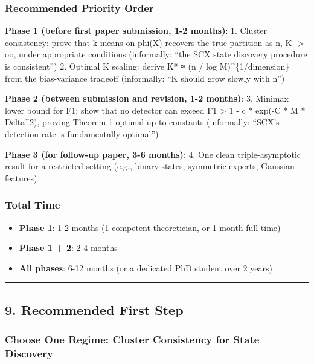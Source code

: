 \documentclass[
  12pt,
]{article}
\providecommand{\tightlist}{%
  \setlength{\itemsep}{0pt}\setlength{\parskip}{0pt}}
\begin{document}
\subsubsection{Recommended Priority
Order}\label{recommended-priority-order}

\textbf{Phase 1 (before first paper submission, 1-2 months)}: 1. Cluster
consistency: prove that k-means on phi(X) recovers the true partition as
n, K -\textgreater{} oo, under appropriate conditions (informally: ``the
SCX state discovery procedure is consistent'') 2. Optimal K scaling:
derive K* ≈ (n / log M)\^{}\{1/dimension\} from the bias-variance
tradeoff (informally: ``K should grow slowly with n'')

\textbf{Phase 2 (between submission and revision, 1-2 months)}: 3.
Minimax lower bound for F1: show that no detector can exceed F1
\textgreater{} 1 - c * exp(-C * M * Delta\^{}2), proving Theorem 1
optimal up to constants (informally: ``SCX's detection rate is
fundamentally optimal'')

\textbf{Phase 3 (for follow-up paper, 3-6 months)}: 4. One clean
triple-asymptotic result for a restricted setting (e.g., binary states,
symmetric experts, Gaussian features)

\subsubsection{Total Time}\label{total-time}

\begin{itemize}
\tightlist
\item
  \textbf{Phase 1}: 1-2 months (1 competent theoretician, or 1 month
  full-time)
\item
  \textbf{Phase 1 + 2}: 2-4 months
\item
  \textbf{All phases}: 6-12 months (or a dedicated PhD student over 2
  years)
\end{itemize}

\begin{center}\rule{0.5\linewidth}{0.5pt}\end{center}

\subsection{9. Recommended First Step}\label{recommended-first-step}

\subsubsection{Choose One Regime: Cluster Consistency for State
Discovery}\label{choose-one-regime-cluster-consistency-for-state-discovery}
\end{document}
